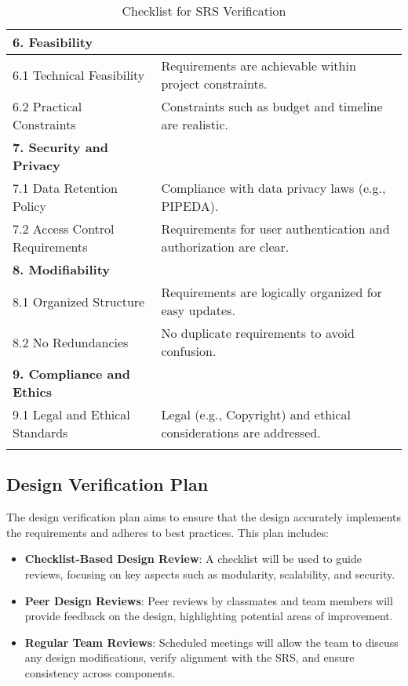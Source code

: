 \documentclass[12pt, titlepage]{article}
\begin{document}
\begin{center}
\begin{longtable}{|p{4cm}|p{11cm}|}
  \hline
  \textbf{6. Feasibility} & \\
  \hline
  6.1 Technical Feasibility & Requirements are achievable within project constraints. \\
  \hline
  6.2 Practical Constraints & Constraints such as budget and timeline are realistic. \\
  \hline
  \textbf{7. Security and Privacy} & \\
  \hline
  7.1 Data Retention Policy & Compliance with data privacy laws (e.g., PIPEDA). \\
  \hline
  7.2 Access Control Requirements & Requirements for user authentication and authorization are clear. \\
  \hline
  \textbf{8. Modifiability} & \\
  \hline
  8.1 Organized Structure & Requirements are logically organized for easy updates. \\
  \hline
  8.2 No Redundancies & No duplicate requirements to avoid confusion. \\
  \hline
  \textbf{9. Compliance and Ethics} & \\
  \hline
  9.1 Legal and Ethical Standards & Legal (e.g., Copyright) and ethical considerations are addressed. \\
  \hline
  \caption{Checklist for SRS Verification}
  \end{longtable}
  \end{center}

\subsection{Design Verification Plan}

The design verification plan aims to ensure that the design accurately implements the requirements and adheres to best practices. This plan includes:

\begin{itemize}
    \item \textbf{Checklist-Based Design Review}: A checklist will be used to guide reviews, focusing on key aspects such as modularity, scalability, and security.
    \item \textbf{Peer Design Reviews}: Peer reviews by classmates and team members will provide feedback on the design, highlighting potential areas of improvement.
    \item \textbf{Regular Team Reviews}: Scheduled meetings will allow the team to discuss any design modifications, verify alignment with the SRS, and ensure consistency across components.
\end{itemize}
\end{document}

